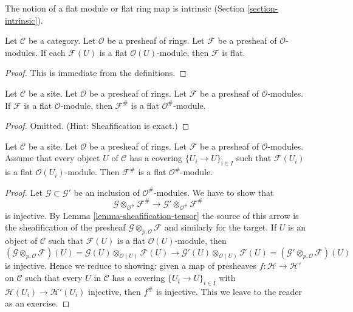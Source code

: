 \noindent
The notion of a flat module or flat ring map is intrinsic
(Section \ref{section-intrinsic}).

\begin{lemma}
\label{lemma-flatness-presheaves}
Let $\mathcal{C}$ be a category.
Let $\mathcal{O}$ be a presheaf of rings.
Let $\mathcal{F}$ be a presheaf of $\mathcal{O}$-modules.
If each $\mathcal{F}(U)$ is a flat $\mathcal{O}(U)$-module,
then $\mathcal{F}$ is flat.
\end{lemma}

\begin{proof}
This is immediate from the definitions.
\end{proof}

\begin{lemma}
\label{lemma-flatness-sheafification}
Let $\mathcal{C}$ be a site.
Let $\mathcal{O}$ be a presheaf of rings.
Let $\mathcal{F}$ be a presheaf of $\mathcal{O}$-modules.
If $\mathcal{F}$ is a flat $\mathcal{O}$-module, then
$\mathcal{F}^\#$ is a flat $\mathcal{O}^\#$-module.
\end{lemma}

\begin{proof}
Omitted. (Hint: Sheafification is exact.)
\end{proof}

\begin{lemma}
\label{lemma-flatness-sheafification-refined}
Let $\mathcal{C}$ be a site. Let $\mathcal{O}$ be a presheaf of rings.
Let $\mathcal{F}$ be a presheaf of $\mathcal{O}$-modules. Assume
that every object $U$ of $\mathcal{C}$ has a covering $\{U_i \to U\}_{i \in I}$
such that $\mathcal{F}(U_i)$ is a flat $\mathcal{O}(U_i)$-module.
Then $\mathcal{F}^\#$ is a flat $\mathcal{O}^\#$-module.
\end{lemma}

\begin{proof}
Let $\mathcal{G} \subset \mathcal{G}'$ be an inclusion of
$\mathcal{O}^\#$-modules. We have to show that
$$
\mathcal{G} \otimes_{\mathcal{O}^\#} \mathcal{F}^\#
\longrightarrow
\mathcal{G}' \otimes_{\mathcal{O}^\#} \mathcal{F}^\#
$$
is injective. By Lemma \ref{lemma-sheafification-tensor}
the source of this arrow is the sheafification of
the presheaf $\mathcal{G} \otimes_{p, \mathcal{O}} \mathcal{F}$
and similarly for the target. If $U$ is an object of $\mathcal{C}$ such that
$\mathcal{F}(U)$ is a flat $\mathcal{O}(U)$-module, then
$$
(\mathcal{G} \otimes_{p, \mathcal{O}} \mathcal{F})(U) =
\mathcal{G}(U) \otimes_{\mathcal{O}(U)} \mathcal{F}(U)
\longrightarrow
\mathcal{G}'(U) \otimes_{\mathcal{O}(U)} \mathcal{F}(U) =
(\mathcal{G}' \otimes_{p, \mathcal{O}} \mathcal{F})(U)
$$
is injective. Hence we reduce to showing: given a map of presheaves
$f : \mathcal{H} \to \mathcal{H}'$ on $\mathcal{C}$ such that
every $U$ in $\mathcal{C}$ has a covering $\{U_i \to U\}_{i \in I}$
with $\mathcal{H}(U_i) \to \mathcal{H}'(U_i)$ injective, then
$f^\#$ is injective. This we leave to the reader as an exercise.
\end{proof}

